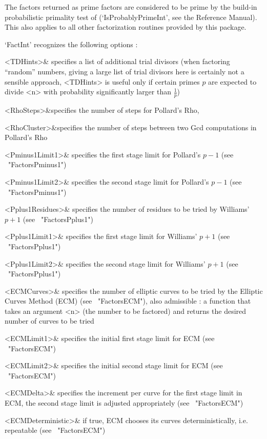 The factors returned as prime factors are considered to be prime 
by the build-in probabilistic primality test of {\GAP} 
(`IsProbablyPrimeInt', see the Reference Manual).
This also applies to all other factorization routines 
provided by this package.

`FactInt' recognizes the following options :

\beginitems
   <TDHints>& specifies a list of additional trial divisors
   (when factoring ``random'' numbers, giving a large list
   of trial divisors here is certainly not a sensible approach,
   <TDHints> is useful only if certain primes $p$ are expected to
   divide <n> with probability significantly larger than 
   $\frac{1}{p}$)

   <RhoSteps>&specifies the number of steps for Pollard's Rho,

   <RhoCluster>&specifies the number of steps between two
   Gcd computations in Pollard's Rho

   <Pminus1Limit1>& specifies the first stage limit for Pollard's $p-1$
   (see ~"FactorsPminus1")

   <Pminus1Limit2>& specifies the second stage limit for Pollard's $p-1$
   (see ~"FactorsPminus1")

   <Pplus1Residues>& specifies the number of residues
   to be tried by Williams' $p+1$ (see ~"FactorsPplus1")

   <Pplus1Limit1>& specifies the first stage limit
   for Williams' $p+1$ (see ~"FactorsPplus1")

   <Pplus1Limit2>& specifies the second stage limit
   for Williams' $p+1$ (see ~"FactorsPplus1")

   <ECMCurves>& specifies the number of elliptic curves to be 
   tried by the Elliptic Curves Method (ECM) (see ~"FactorsECM"),
   also admissible : a function that takes an argument <n>
   (the number to be factored) and returns the desired number
   of curves to be tried 

   <ECMLimit1>& specifies the initial first stage limit
   for ECM (see ~"FactorsECM")

   <ECMLimit2>& specifies the initial second stage limit
   for ECM (see ~"FactorsECM")

   <ECMDelta>& specifies the increment per curve for the 
   first stage limit in ECM, the second stage limit is adjusted
   appropriately (see ~"FactorsECM")

   <ECMDeterministic>& if true, ECM chooses its curves 
   deterministically, i.e. repeatable (see ~"FactorsECM")

